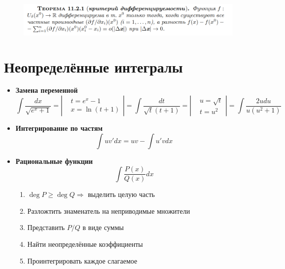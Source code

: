 \documentclass{article}
\begin{document}
\begin{figure}[h!]
    \centering
    \includegraphics[width=\textwidth]{39.png}
    \vspace{-1cm}
\end{figure}


\newpage
\section{\color{RedViolet}\textbf{Неопределённые интегралы}}
\begin{itemize}
    \item \textbf{Замена переменной}
          \begin{equation*}
              \int\frac{dx}{\sqrt{e^x+1}} = \left|
              \begin{aligned}
                   & t = e^x-1    \\
                   & x = \ln(t+1)
              \end{aligned} \right| = \int\frac{dt}{\sqrt{t}(t+1)} = \left|
              \begin{aligned}
                   & u = \sqrt{t} \\
                   & t = u^2
              \end{aligned} \right| = \int\frac{2udu}{u(u^2+1)}
          \end{equation*}
    \item \textbf{Интегрирование по частям}
          \begin{equation*}
              \int u v'dx = uv - \int u' v dx
          \end{equation*}
    \item \textbf{Рациональные функции}
          $$\int\frac{P(x)}{Q(x)}dx $$
          \begin{enumerate}
              \item $\deg P \geq \deg Q \Rightarrow$ выделить целую часть
              \item Разложтить знаменатель на неприводимые множители
              \item Представить $P/Q$ в виде суммы
              \item Найти неопределённые коэффициенты
              \item Проинтегрировать каждое слагаемое

\end{enumerate}
\end{itemize}
\end{document}
